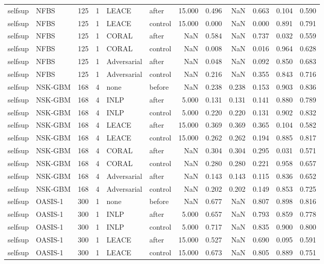 \begin{tabular}{llrrllrrrrrr}
selfsup & NFBS & 125 & 1 & LEACE & after & 15.000 & 0.496 & NaN & 0.663 & 0.104 & 0.590 \\
selfsup & NFBS & 125 & 1 & LEACE & control & 15.000 & 0.000 & NaN & 0.000 & 0.891 & 0.791 \\
selfsup & NFBS & 125 & 1 & CORAL & after & NaN & 0.584 & NaN & 0.737 & 0.032 & 0.559 \\
selfsup & NFBS & 125 & 1 & CORAL & control & NaN & 0.008 & NaN & 0.016 & 0.964 & 0.628 \\
selfsup & NFBS & 125 & 1 & Adversarial & after & NaN & 0.048 & NaN & 0.092 & 0.850 & 0.683 \\
selfsup & NFBS & 125 & 1 & Adversarial & control & NaN & 0.216 & NaN & 0.355 & 0.843 & 0.716 \\
selfsup & NSK-GBM & 168 & 4 & none & before & NaN & 0.238 & 0.238 & 0.153 & 0.903 & 0.836 \\
selfsup & NSK-GBM & 168 & 4 & INLP & after & 5.000 & 0.131 & 0.131 & 0.141 & 0.880 & 0.789 \\
selfsup & NSK-GBM & 168 & 4 & INLP & control & 5.000 & 0.220 & 0.220 & 0.131 & 0.902 & 0.832 \\
selfsup & NSK-GBM & 168 & 4 & LEACE & after & 15.000 & 0.369 & 0.369 & 0.365 & 0.104 & 0.582 \\
selfsup & NSK-GBM & 168 & 4 & LEACE & control & 15.000 & 0.262 & 0.262 & 0.194 & 0.885 & 0.817 \\
selfsup & NSK-GBM & 168 & 4 & CORAL & after & NaN & 0.304 & 0.304 & 0.295 & 0.031 & 0.571 \\
selfsup & NSK-GBM & 168 & 4 & CORAL & control & NaN & 0.280 & 0.280 & 0.221 & 0.958 & 0.657 \\
selfsup & NSK-GBM & 168 & 4 & Adversarial & after & NaN & 0.143 & 0.143 & 0.115 & 0.836 & 0.652 \\
selfsup & NSK-GBM & 168 & 4 & Adversarial & control & NaN & 0.202 & 0.202 & 0.149 & 0.853 & 0.725 \\
selfsup & OASIS-1 & 300 & 1 & none & before & NaN & 0.677 & NaN & 0.807 & 0.898 & 0.816 \\
selfsup & OASIS-1 & 300 & 1 & INLP & after & 5.000 & 0.657 & NaN & 0.793 & 0.859 & 0.778 \\
selfsup & OASIS-1 & 300 & 1 & INLP & control & 5.000 & 0.717 & NaN & 0.835 & 0.900 & 0.800 \\
selfsup & OASIS-1 & 300 & 1 & LEACE & after & 15.000 & 0.527 & NaN & 0.690 & 0.095 & 0.591 \\
selfsup & OASIS-1 & 300 & 1 & LEACE & control & 15.000 & 0.673 & NaN & 0.805 & 0.889 & 0.751 \\

\end{tabular}
